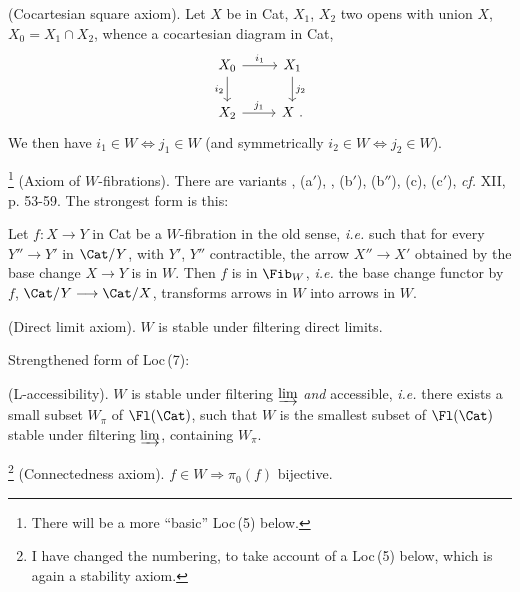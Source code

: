 

\begin{description}[labelwidth=5.5em,leftmargin=6.5em,style=sameline]
\item[Loc\,(4)] (Cocartesian square axiom). Let $X$ be in Cat, $X_1$, $X_2$ two opens with union $X$, $X_0 = X_1\cap X_2$, whence a cocartesian diagram in Cat,
\[
\begin{tikzcd}
X_0 \arrow[r, "i_1"] \arrow[d, "i_2"'] & X_1 \arrow[d, "j_2"] \\
X_2 \arrow[r, "j_1"] & X\ .
\end{tikzcd}
\]
We then have $i_1\in W \iff j_1\in W$ (and symmetrically $i_2\in W \iff j_2\in W$).

\item[Loc\,(6)]\footnote[44]{There will be a more ``basic'' Loc\,(5) below.} (Axiom of $W$-fibrations). There are variants , (a$'$), , (b$'$), (b$''$), (c), (c$'$), \textit{cf.} XII, p. 53-59. The strongest form  is this:

Let $f : X\longrightarrow Y$ in Cat be a $W$-fibration in the old sense, \textit{i.e.} such that for every $Y''\longrightarrow Y'$ in $\Cat/Y$, with $Y'$, $Y''$ contractible, the arrow $X''\longrightarrow X'$ obtained by the base change $X\longrightarrow Y$ is in $W$. Then $f$ is in $\Fib_W$, \textit{i.e.} the base change functor by $f$, $\Cat/Y\longrightarrow\Cat/X$, transforms arrows in $W$ into arrows in $W$.

\item[Loc\,(7)] (Direct limit axiom). $W$ is stable under filtering direct limits.
\end{description}

Strengthened form of Loc\,(7):

\begin{description}[labelwidth=5.5em,leftmargin=6.5em,style=sameline]
\item[Loc\,(7\,bis)] (L-accessibility). $W$ is stable under filtering $\varinjlim$ \textit{and} accessible, \textit{i.e.} there exists a small subset $W_\pi$ of $\Fl(\Cat)$, such that $W$ is the smallest subset of $\Fl(\Cat)$ stable under filtering $\varinjlim$, containing $W_\pi$.
\end{description}


\begin{description}[labelwidth=5.5em,leftmargin=6.5em,style=sameline]
\item[Loc\,(8)]\footnote[45]{I have changed the numbering, to take account of a Loc\,(5) below, which is again a stability axiom.} (Connectedness axiom). $f\in W\Longrightarrow \pi_0(f)$ bijective.
\end{description}

